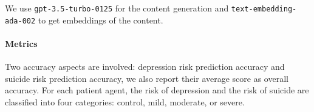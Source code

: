 

We use \texttt{gpt-3.5-turbo-0125} \cite{chatgpt} for the content generation and \texttt{text-embedding-ada-002} to get embeddings of the content.

\paragraph{Metrics} Two accuracy aspects are involved:
depression risk prediction accuracy and suicide risk prediction accuracy, we also report their average score as overall accuracy. For each patient agent, the risk of depression and the risk of suicide are classified into four categories: control, mild, moderate, or severe.

